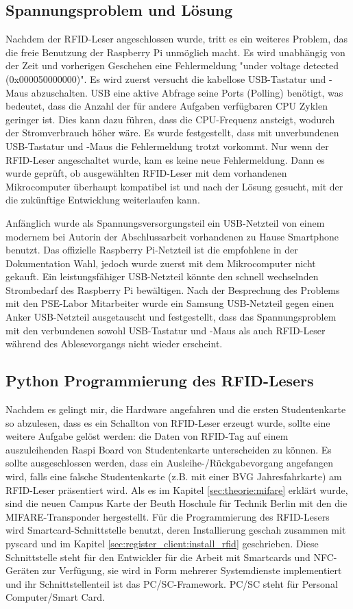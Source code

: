 \subsection{Spannungsproblem und Lösung}
\label{sec:register_client:voltage_issue}
Nachdem der RFID-Leser angeschlossen wurde, tritt es ein weiteres Problem, das die freie Benutzung der Raspberry Pi unmöglich macht. Es wird unabhängig von der Zeit und vorherigen Geschehen eine Fehlermeldung "under voltage detected (0x000050000000)". Es wird zuerst versucht die kabellose USB-Tastatur und -Maus abzuschalten. USB eine aktive Abfrage seine Ports (Polling) benötigt, was bedeutet, dass die Anzahl der für andere Aufgaben verfügbaren CPU Zyklen geringer ist. Dies kann dazu führen, dass die CPU-Frequenz ansteigt, wodurch der Stromverbrauch höher wäre. Es wurde festgestellt, dass mit unverbundenen USB-Tastatur und -Maus die Fehlermeldung trotzt vorkommt. Nur wenn der RFID-Leser angeschaltet wurde, kam es keine neue Fehlermeldung. Dann es wurde geprüft, ob ausgewählten RFID-Leser mit dem vorhandenen Mikrocomputer überhaupt kompatibel ist und nach der Lösung gesucht, mit der die zukünftige Entwicklung weiterlaufen kann.    

Anfänglich wurde als Spannungsversorgungsteil ein USB-Netzteil von einem modernem bei Autorin der Abschlussarbeit vorhandenen zu Hause Smartphone benutzt. Das offizielle Raspberry Pi-Netzteil ist die empfohlene in der Dokumentation Wahl, jedoch wurde zuerst mit dem Mikrocomputer nicht gekauft. Ein leistungsfähiger USB-Netzteil könnte den schnell wechselnden Strombedarf des Raspberry Pi bewältigen. Nach der Besprechung des Problems mit den PSE-Labor Mitarbeiter wurde ein Samsung USB-Netzteil gegen einen Anker USB-Netzteil ausgetauscht und festgestellt, dass das Spannungsproblem mit den verbundenen sowohl USB-Tastatur und -Maus als auch RFID-Leser während des Ablesevorgangs nicht wieder erscheint. 

\subsection{Python Programmierung des RFID-Lesers}
\label{sec:register_client:smart}
Nachdem es gelingt mir, die Hardware angefahren und die ersten Studentenkarte so abzulesen, dass es ein Schallton von RFID-Leser erzeugt wurde, sollte eine weitere Aufgabe gelöst werden: die Daten von RFID-Tag auf einem auszuleihenden Raspi Board von Studentenkarte unterscheiden zu können. Es sollte ausgeschlossen werden, dass ein Ausleihe-/Rückgabevorgang angefangen wird, falls eine falsche Studentenkarte (z.B. mit einer BVG Jahresfahrkarte) am RFID-Leser präsentiert wird. Als es im Kapitel \ref{sec:theorie:mifare} erklärt wurde, sind die neuen Campus Karte der Beuth Hoschule für Technik Berlin mit den die MIFARE-Transponder hergestellt. Für die Programmierung des RFID-Lesers wird Smartcard-Schnittstelle benutzt, deren Installierung geschah zusammen mit pyscard und im Kapitel \ref{sec:register_client:install_rfid} geschrieben. Diese Schnittstelle steht für den Entwickler für die Arbeit mit Smartcards und NFC-Geräten zur Verfügung, sie wird in Form mehrerer Systemdienste implementiert und ihr Schnittstellenteil ist das PC/SC-Framework. PC/SC steht für Personal Computer/Smart Card.

